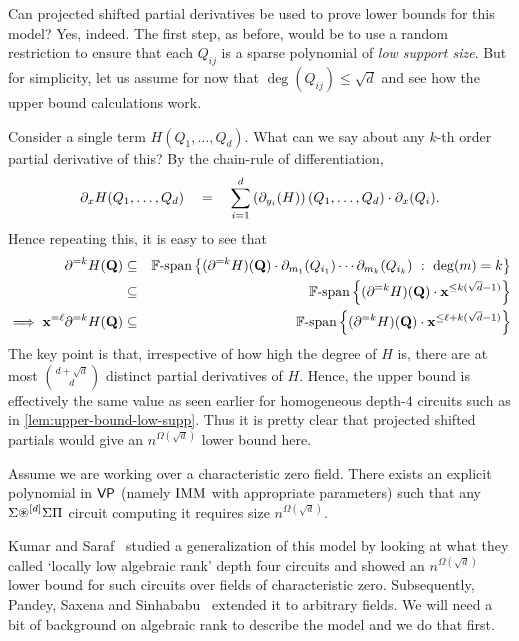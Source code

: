 Can projected shifted partial derivatives be used to prove lower bounds for this model? Yes, indeed. The first step, as before, would be to use a random restriction to ensure that each $Q_{ij}$ is a sparse polynomial of \emph{low support size}. But for simplicity, let us assume for now that $\deg(Q_{ij})\leq \sqrt{d}$ and see how the upper bound calculations work. 

Consider a single term $H(Q_1,\ldots, Q_d)$. What can we say about any $k$-th order partial derivative of this? By the chain-rule of differentiation,
\[
\partial_{x} H(Q_1,\ldots, Q_d) \quad = \quad  \sum_{i=1}^d \left(\partial_{y_i}(H)\right)(Q_1,\ldots, Q_d) \cdot \partial_x(Q_i). 
\]
Hence repeating this, it is easy to see that 
\begin{eqnarray*}
\partial^{=k} H(\mathbf{Q}) &\subseteq& \operatorname{\mathbb{F}\text{-span}} \left\{{(\partial^{=k}H)(\mathbf{Q}) \cdot \partial_{m_1}(Q_{i_1}) \cdots \partial_{m_k}(Q_{i_k})}\ : \ {\deg(m) = k}\right\}\\
& \subseteq & \operatorname{\mathbb{F}\text{-span}}\left\{(\partial^{=k}H)(\mathbf{Q}) \cdot \mathbf{x}^{\leq k(\sqrt{d}-1)}\right\}\\
\implies \mathbf{x}^{=\ell}\partial^{=k} H(\mathbf{Q}) & \subseteq & \operatorname{\mathbb{F}\text{-span}}\left\{(\partial^{=k}H)(\mathbf{Q}) \cdot \mathbf{x}^{\leq \ell + k(\sqrt{d}-1)}\right\}
\end{eqnarray*}
The key point is that, irrespective of how high the degree of $H$ is, there are at most $\binom{d+\sqrt{d}}{d}$ distinct partial derivatives of $H$.
Hence, the upper bound is effectively the same value as seen earlier for homogeneous depth-$4$ circuits such as in \autoref{lem:upper-bound-low-supp}.
Thus it is pretty clear that projected shifted partials would give an $n^{\Omega(\sqrt{d})}$ lower bound here. 

\begin{observation}\label{obs:locally-low-algRank-warmup}
Assume we are working over a characteristic zero field. There exists an explicit polynomial in $\mathsf{VP}$ (namely $\operatorname{\mathrm{IMM}}$ with appropriate parameters) such that any $\Sigma\circast^{[d]}\Sigma\Pi$ circuit computing it requires size $n^{\Omega(\sqrt{d})}$. 
\end{observation}

Kumar and Saraf~\cite{KS16lowrank} studied a generalization of this model by looking at what they called `locally low algebraic rank' depth four circuits and showed an $n^{\Omega(\sqrt{d})}$ lower bound for such circuits over fields of characteristic zero. Subsequently, Pandey, Saxena and Sinhababu~\cite{PSS16} extended it to arbitrary fields. We will need a bit of background on algebraic rank to describe the model and we do that first. 

